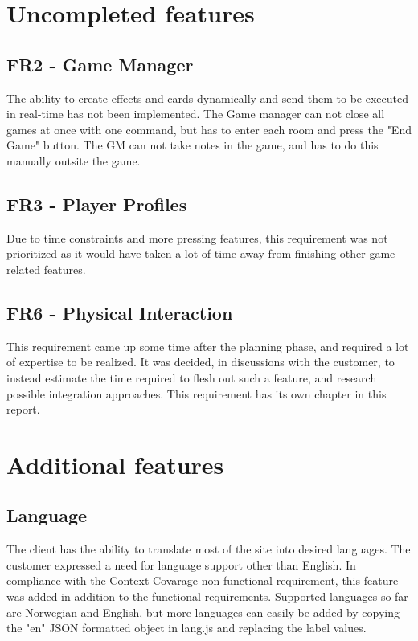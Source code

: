\section{Uncompleted features}

\subsection{FR2 - Game Manager}
The ability to create effects and cards dynamically and send them to be executed in real-time has not been implemented. The Game manager can not close all games at once with one command, but has to enter each room and press the "End Game" button. The GM can not take notes in the game, and has to do this manually outsite the game.\\

\subsection{FR3 - Player Profiles}
Due to time constraints and more pressing features, this requirement was not prioritized as it would have taken a lot of time away from finishing other game related features.\\

\subsection{FR6 - Physical Interaction}
This requirement came up some time after the planning phase, and required a lot of expertise to be realized. It was decided, in discussions with the customer, to instead estimate the time required to flesh out such a feature, and research possible integration approaches. This requirement has its own chapter in this report.\\

\section{Additional features}


\subsection{Language}
The client has the ability to translate most of the site into desired languages. The customer expressed a need for language support other than English. In compliance with the Context Covarage non-functional requirement, this feature was added in addition to the functional requirements. Supported languages so far are Norwegian and English, but more languages can easily be added by copying the "en" JSON formatted object in lang.js and replacing the label values.\\

